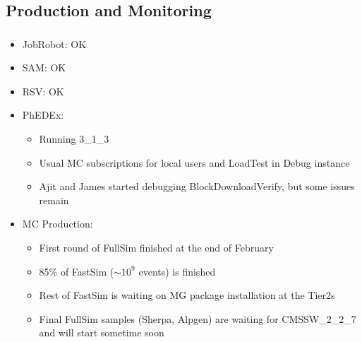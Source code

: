 \documentclass{beamer}
\newcommand{\ca}{\ensuremath{\sim}}
\begin{document}
\subsection{Production and Monitoring}
\begin{frame}
\frametitle{}
\begin{itemize}
     \item JobRobot: OK
     \item SAM: OK
     \item RSV: OK
     \item PhEDEx:
     \begin{itemize}
        \item Running 3\_1\_3
        \item Usual MC subscriptions for local users and LoadTest in Debug instance
        \item Ajit and James started debugging BlockDownloadVerify, but some issues remain
     \end{itemize}
     \item MC Production:
     \begin{itemize}
        \item First round of FullSim finished at the end of February
        \item 85\% of FastSim (\ca{}$10^9$ events) is finished
        \item Rest of FastSim is waiting on MG package installation at the Tier2s
        \item Final FullSim samples (Sherpa, Alpgen) are waiting for CMSSW\_2\_2\_7 and will start sometime soon
     \end{itemize}
\end{itemize}
\end{frame}
\end{document}
